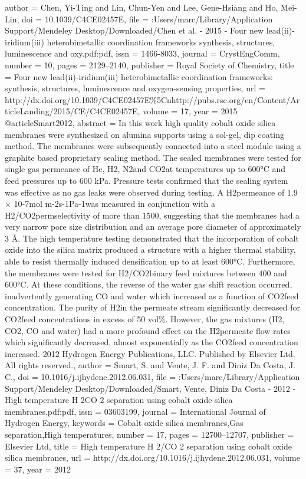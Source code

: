 {author = {Chen, Yi-Ting and Lin, Chun-Yen and Lee, Gene-Hsiang and Ho, Mei-Lin},
doi = {10.1039/C4CE02457E},
file = {:Users/marc/Library/Application Support/Mendeley Desktop/Downloaded/Chen et al. - 2015 - Four new lead(ii)-iridium(iii) heterobimetallic coordination frameworks synthesis, structures, luminescence and oxy.pdf:pdf},
issn = {1466-8033},
journal = {CrystEngComm},
number = {10},
pages = {2129--2140},
publisher = {Royal Society of Chemistry},
title = {{Four new lead(ii)-iridium(iii) heterobimetallic coordination frameworks: synthesis, structures, luminescence and oxygen-sensing properties}},
url = {http://dx.doi.org/10.1039/C4CE02457E{\%}5Cnhttp://pubs.rsc.org/en/Content/ArticleLanding/2015/CE/C4CE02457E},
volume = {17},
year = {2015}
}
@article{Smart2012,
abstract = {In this work high quality cobalt oxide silica membranes were synthesized on alumina supports using a sol-gel, dip coating method. The membranes were subsequently connected into a steel module using a graphite based proprietary sealing method. The sealed membranes were tested for single gas permeance of He, H2, N2and CO2at temperatures up to 600°C and feed pressures up to 600 kPa. Pressure tests confirmed that the sealing system was effective as no gas leaks were observed during testing. A H2permeance of 1.9 × 10-7mol m-2s-1Pa-1was measured in conjunction with a H2/CO2permselectivity of more than 1500, suggesting that the membranes had a very narrow pore size distribution and an average pore diameter of approximately 3 {\AA}. The high temperature testing demonstrated that the incorporation of cobalt oxide into the silica matrix produced a structure with a higher thermal stability, able to resist thermally induced densification up to at least 600°C. Furthermore, the membranes were tested for H2/CO2binary feed mixtures between 400 and 600°C. At these conditions, the reverse of the water gas shift reaction occurred, inadvertently generating CO and water which increased as a function of CO2feed concentration. The purity of H2in the permeate stream significantly decreased for CO2feed concentrations in excess of 50 vol{\%}. However, the gas mixtures (H2, CO2, CO and water) had a more profound effect on the H2permeate flow rates which significantly decreased, almost exponentially as the CO2feed concentration increased. {\textcopyright} 2012 Hydrogen Energy Publications, LLC. Published by Elsevier Ltd. All rights reserved.},
author = {Smart, S. and Vente, J. F. and {Diniz Da Costa}, J. C.},
doi = {10.1016/j.ijhydene.2012.06.031},
file = {:Users/marc/Library/Application Support/Mendeley Desktop/Downloaded/Smart, Vente, Diniz Da Costa - 2012 - High temperature H 2CO 2 separation using cobalt oxide silica membranes.pdf:pdf},
issn = {03603199},
journal = {International Journal of Hydrogen Energy},
keywords = {Cobalt oxide silica membranes,Gas separation,High temperatures},
number = {17},
pages = {12700--12707},
publisher = {Elsevier Ltd},
title = {{High temperature H 2/CO 2 separation using cobalt oxide silica membranes}},
url = {http://dx.doi.org/10.1016/j.ijhydene.2012.06.031},
volume = {37},
year = {2012}
}
